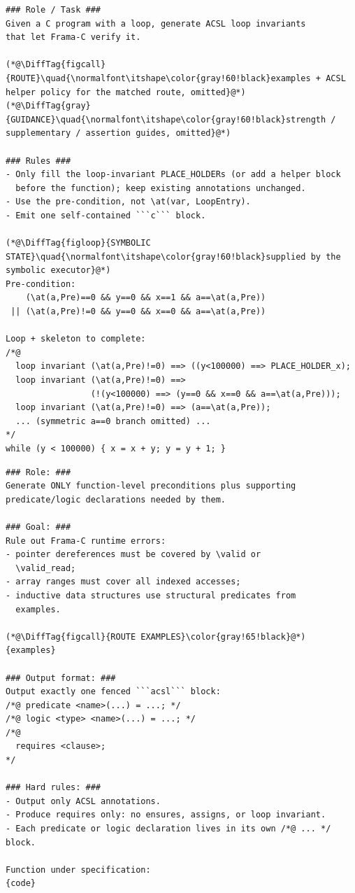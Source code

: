 \begin{tcolorbox}[promptboxcompact, title={Loop-invariant generation prompt}]
\begin{lstlisting}[style=PromptInnerCompact]
### Role / Task ###
Given a C program with a loop, generate ACSL loop invariants
that let Frama-C verify it.

(*@\DiffTag{figcall}{ROUTE}\quad{\normalfont\itshape\color{gray!60!black}examples + ACSL helper policy for the matched route, omitted}@*)
(*@\DiffTag{gray}{GUIDANCE}\quad{\normalfont\itshape\color{gray!60!black}strength / supplementary / assertion guides, omitted}@*)

### Rules ###
- Only fill the loop-invariant PLACE_HOLDERs (or add a helper block
  before the function); keep existing annotations unchanged.
- Use the pre-condition, not \at(var, LoopEntry).
- Emit one self-contained ```c``` block.

(*@\DiffTag{figloop}{SYMBOLIC STATE}\quad{\normalfont\itshape\color{gray!60!black}supplied by the symbolic executor}@*)
Pre-condition:
    (\at(a,Pre)==0 && y==0 && x==1 && a==\at(a,Pre))
 || (\at(a,Pre)!=0 && y==0 && x==0 && a==\at(a,Pre))

Loop + skeleton to complete:
/*@
  loop invariant (\at(a,Pre)!=0) ==> ((y<100000) ==> PLACE_HOLDER_x);
  loop invariant (\at(a,Pre)!=0) ==>
                 (!(y<100000) ==> (y==0 && x==0 && a==\at(a,Pre)));
  loop invariant (\at(a,Pre)!=0) ==> (a==\at(a,Pre));
  ... (symmetric a==0 branch omitted) ...
*/
while (y < 100000) { x = x + y; y = y + 1; }
\end{lstlisting}
\end{tcolorbox}

\leavevmode\par\nobreak\vspace{6pt}

\begin{tcolorbox}[promptboxcompact, title={Precondition fallback prompt}]
\begin{lstlisting}[style=PromptInnerCompact]
### Role: ###
Generate ONLY function-level preconditions plus supporting
predicate/logic declarations needed by them.

### Goal: ###
Rule out Frama-C runtime errors:
- pointer dereferences must be covered by \valid or
  \valid_read;
- array ranges must cover all indexed accesses;
- inductive data structures use structural predicates from
  examples.

(*@\DiffTag{figcall}{ROUTE EXAMPLES}\color{gray!65!black}@*)
{examples}

### Output format: ###
Output exactly one fenced ```acsl``` block:
/*@ predicate <name>(...) = ...; */
/*@ logic <type> <name>(...) = ...; */
/*@
  requires <clause>;
*/

### Hard rules: ###
- Output only ACSL annotations.
- Produce requires only: no ensures, assigns, or loop invariant.
- Each predicate or logic declaration lives in its own /*@ ... */ block.

Function under specification:
{code}
\end{lstlisting}
\end{tcolorbox}

